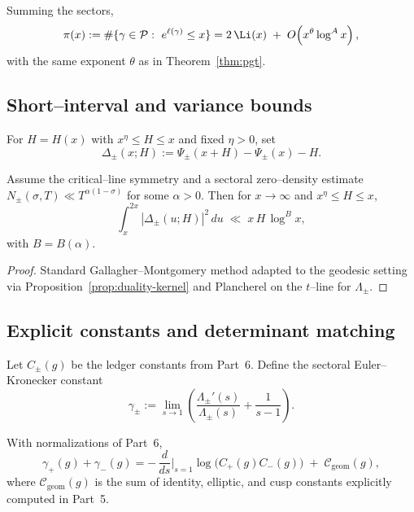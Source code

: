 \begin{corollary}
\label{cor:pgt-sum}
Summing the sectors,
\[
\pi(x):=\#\{\gamma\in\mathcal P:\ e^{\ell(\gamma)}\le x\}
= 2\,\Li(x) \;+\; O\!\left(x^{\theta}\log^A x\right),
\]
with the same exponent $\theta$ as in Theorem~\ref{thm:pgt}.  %
\end{corollary}


\subsection{Short–interval and variance bounds}
\label{subsec:ch6-part8-short} \relax \hspace{0pt}
For $H=H(x)$ with $x^\eta\le H\le x$ and fixed $\eta>0$, set
\[
\Delta_\pm(x;H)
:= \Psi_\pm(x+H)-\Psi_\pm(x)-H.
\]

\begin{proposition}
\label{prop:variance}
Assume the critical–line symmetry and a sectoral zero–density estimate $N_\pm(\sigma,T)\ll T^{\alpha(1-\sigma)}$ for some $\alpha>0$. Then for $x\to\infty$ and $x^\eta\le H\le x$,
\[
\int_x^{2x} |\Delta_\pm(u;H)|^2\,du
\;\ll\; x\,H\,\log^{B} x,
\]
with $B=B(\alpha)$.  %
\end{proposition}

\begin{proof}
Standard Gallagher–Montgomery method adapted to the geodesic setting via Proposition~\ref{prop:duality-kernel} and Plancherel on the $t$–line for $\Lambda_\pm$.  %
\end{proof}


\subsection{Explicit constants and determinant matching}
\label{subsec:ch6-part8-constants} \relax \hspace{0pt}
Let $C_\pm(g)$ be the ledger constants from Part~6. Define the sectoral Euler–Kronecker constant
\[
\gamma_\pm
:= \lim_{s\to1} \left(\frac{\Lambda_\pm'(s)}{\Lambda_\pm(s)}+\frac{1}{s-1}\right).
\]

\begin{proposition}
\label{prop:constants}
With normalizations of Part~6,
\[
\gamma_+(g)+\gamma_-(g)
= -\,\frac{d}{ds}\Big|_{s=1}\log\big(C_+(g)C_-(g)\big)
\;+\; \mathcal C_{\mathrm{geom}}(g),
\]
where $\mathcal C_{\mathrm{geom}}(g)$ is the sum of identity, elliptic, and cusp constants explicitly computed in Part~5.  %
\end{proposition}

